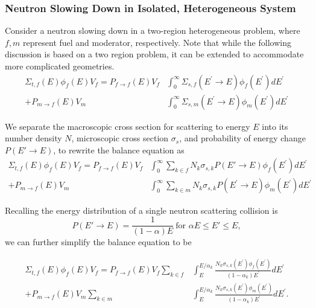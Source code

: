 \documentclass[10pt]{article}
\begin{document}
\subsubsection{Neutron Slowing Down in Isolated, Heterogeneous System}
Consider a neutron slowing down in a two-region heterogeneous problem, where $f,m$ represent fuel and moderator, respectively. Note that while the following discussion is based on a two region problem, it can be extended to accommodate more complicated geometries.
\begin{align}\Sigma_{t,f}(E)\phi_{f}(E)V_{f}=P_{f\rightarrow f}(E)V_{f}&\int_{0}^{\infty}\Sigma_{s,f}\left(E^{\prime}\rightarrow E\right)\phi_{f}\left(E^{\prime}\right)dE^{\prime}\\ + P_{m\rightarrow f}(E)V_{m}&\int_{0}^{\infty}\Sigma_{s,m}\left(E^{\prime}\rightarrow E\right)\phi_{m}\left(E^{\prime}\right)dE^{\prime}\end{align}

We separate the macroscopic cross section for scattering to energy $E$ into its number density $N$, microscopic cross section $\sigma_s$, and probability of energy change $P(E'\rightarrow E)$, to rewrite the balance equation as 
\begin{align}\Sigma_{t,f}(E)\phi_{f}(E)V_{f}=P_{f\rightarrow f}(E)V_{f}&\int_{0}^{\infty}\sum\limits_{k\in f}N_k\sigma_{s,k}P(E'\rightarrow E)\phi_{f}\left(E^{\prime}\right)dE^{\prime}\\ + P_{m\rightarrow f}(E)V_{m}&\int_{0}^{\infty}\sum\limits_{k\in m}N_k\sigma_{s,k}P\left(E^{\prime}\rightarrow E\right)\phi_{m}\left(E^{\prime}\right)dE^{\prime}\end{align}

Recalling the energy distribution of a single neutron scattering collision is 
\begin{equation}P(E'\rightarrow E)=\frac{1}{(1-\alpha)E}~\mbox{for }\alpha E\leq E'\leq E,\end{equation}
we can further simplify the balance equation to be

\begin{align}\Sigma_{t,f}(E)\phi_{f}(E)V_{f} = P_{f\rightarrow f}(E)V_{f}\sum\limits_{k\in f}&\int_{E}^{E/\alpha_{k}}\frac{N_{k}\sigma_{s,k}\left(E^{\prime}\right)\phi_{f}\left(E^{\prime}\right)}{\left(1-\alpha_{k}\right)E^{\prime}}dE^{\prime}  \\
+ P_{m\rightarrow f}(E)V_{m}\sum\limits_{k\in m}&\int_{E}^{E/\alpha_{k}}\frac{N_{k}\sigma_{s,k}\left(E^{\prime}\right)\phi_{m}\left(E^{\prime}\right)}{\left(1-\alpha_{k}\right)E^{\prime}}dE^{\prime}.\label{eq:hetero-balance}\end{align}
\end{document}
